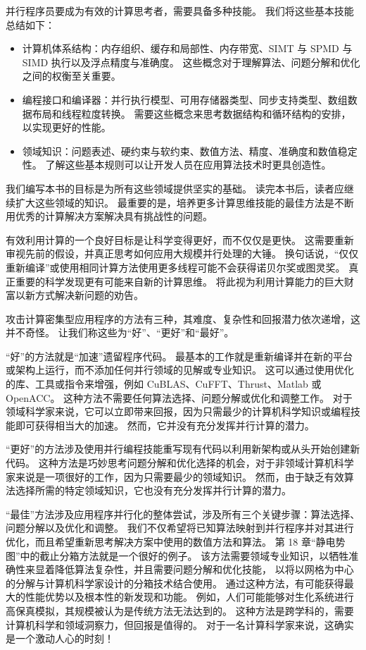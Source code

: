 并行程序员要成为有效的计算思考者，需要具备多种技能。 我们将这些基本技能总结如下：
\begin{itemize}
	\item 计算机体系结构：内存组织、缓存和局部性、内存带宽、SIMT 与 SPMD 与 SIMD 执行以及浮点精度与准确度。 
		这些概念对于理解算法、问题分解和优化之间的权衡至关重要。

	\item 编程接口和编译器：并行执行模型、可用存储器类型、同步支持类型、数组数据布局和线程粒度转换。 
		需要这些概念来思考数据结构和循环结构的安排，以实现更好的性能。

	\item 领域知识：问题表述、硬约束与软约束、数值方法、精度、准确度和数值稳定性。 
		了解这些基本规则可以让开发人员在应用算法技术时更具创造性。
\end{itemize}

我们编写本书的目标是为所有这些领域提供坚实的基础。 读完本书后，读者应继续扩大这些领域的知识。 
最重要的是，培养更多计算思维技能的最佳方法是不断用优秀的计算解决方案解决具有挑战性的问题。

有效利用计算的一个良好目标是让科学变得更好，而不仅仅是更快。 
这需要重新审视先前的假设，并真正思考如何应用大规模并行处理的大锤。 
换句话说，“仅仅重新编译”或使用相同计算方法使用更多线程可能不会获得诺贝尔奖或图灵奖。
 真正重要的科学发现更有可能来自新的计算思维。 将此视为利用计算能力的巨大财富以新方式解决新问题的劝告。

攻击计算密集型应用程序的方法有三种，其难度、复杂性和回报潜力依次递增，这并不奇怪。 
让我们称这些为“好”、“更好”和“最好”。

“好”的方法就是“加速”遗留程序代码。 
最基本的工作就是重新编译并在新的平台或架构上运行，而不添加任何并行领域的见解或专业知识。 
这可以通过使用优化的库、工具或指令来增强，例如 CuBLAS、CuFFT、Thrust、Matlab 或 OpenACC。 
这种方法不需要任何算法选择、问题分解或优化和调整工作。 
对于领域科学家来说，它可以立即带来回报，因为只需最少的计算机科学知识或编程技能即可获得相当大的加速。 
然而，它并没有充分发挥并行计算的潜力。

“更好”的方法涉及使用并行编程技能重写现有代码以利用新架构或从头开始创建新代码。 
这种方法是巧妙思考问题分解和优化选择的机会，对于非领域计算机科学家来说是一项很好的工作，因为只需要最少的领域知识。 
然而，由于缺乏有效算法选择所需的特定领域知识，它也没有充分发挥并行计算的潜力。

“最佳”方法涉及应用程序并行化的整体尝试，涉及所有三个关键步骤：算法选择、问题分解以及优化和调整。 
我们不仅希望将已知算法映射到并行程序并对其进行优化，而且希望重新思考解决方案中使用的数值方法和算法。 
第 18 章“静电势图”中的截止分箱方法就是一个很好的例子。 
该方法需要领域专业知识，以牺牲准确性来显着降低算法复杂性，并且需要问题分解和优化技能，
以将以网格为中心的分解与计算机科学家设计的分箱技术结合使用。 
通过这种方法，有可能获得最大的性能优势以及根本性的新发现和功能。 
例如，人们可能能够对生化系统进行高保真模拟，其规模被认为是传统方法无法达到的。 
这种方法是跨学科的，需要计算机科学和领域洞察力，但回报是值得的。 对于一名计算科学家来说，这确实是一个激动人心的时刻！

